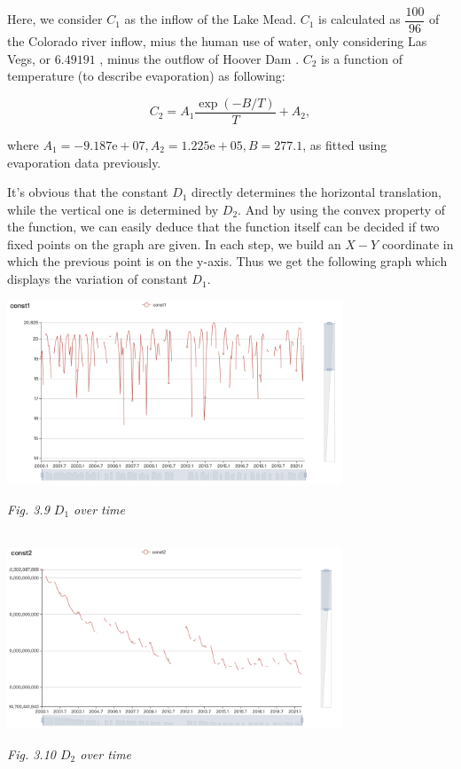 \documentclass[12pt]{article}
\theoremstyle{definition}
\theoremstyle{remark}
\numberwithin{equation}{section}
\begin{document}
		Here, we consider $C_1$ as the inflow of the Lake Mead. $C_1$ is calculated as $\dfrac{100}{96}$ of the Colorado river inflow, mius the human use of water, only considering Las Vegs, or $6.49191$ \cite{Water Use in Las Vegas}, minus the outflow of Hoover Dam \cite{Water Level Data}. $C_2$ is a function of temperature (to describe evaporation) as following:

		$$C_2 = A_1 \frac{\exp(-B / T)}{T} + A_2,$$

		where $A_1 = -9.187\mathrm{e}+07, A_2 = 1.225\mathrm{e}+05, B = 277.1$, as fitted using evaporation data previously.

		It's obvious that the constant $D_1$ directly determines the horizontal translation, while the vertical one is determined by $D_2$. And by using the convex property of the function, we can easily deduce that the function itself can be decided if two fixed points on the graph are given. In each step, we build an $X-Y$ coordinate in which the previous point is on the y-axis. Thus we get the following graph which displays the variation of constant $D_1$. 

		\begin{center}
		\includegraphics[width=10cm]{3.9 D_1 over time.jpg}

		\small \textit{Fig. 3.9 $D_1$ over time}

		~\\

		\includegraphics[width=10cm]{3.10 D_2 over time.jpg}

		\small \textit{Fig. 3.10 $D_2$ over time}
		\end{center}
\end{document}
